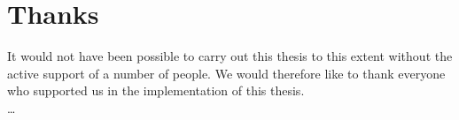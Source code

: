 \section*{Thanks}
It would not have been possible to carry out this thesis to this extent without the active support of a number of people. We would therefore like to thank everyone who supported us in the implementation of this thesis. \\
\dots